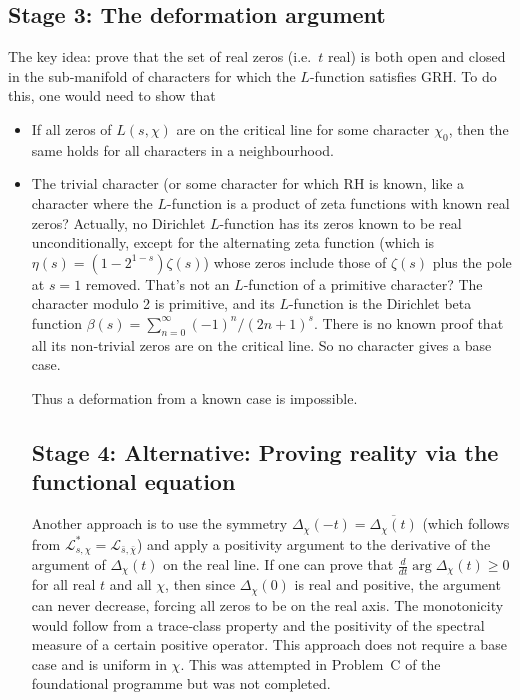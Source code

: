 \documentclass[11pt,a4paper]{article}
\begin{document}
\begin{enumerate}
\subsection{Stage 3: The deformation argument}
The key idea: prove that the set of real zeros (i.e.\ \(t\) real) is both open and closed in the sub‑manifold of characters for which the \(L\)-function satisfies GRH.  To do this, one would need to show that
\begin{itemize}
\item If all zeros of \(L(s,\chi)\) are on the critical line for some character \(\chi_0\), then the same holds for all characters in a neighbourhood.
\item The trivial character (or some character for which RH is known, like a character where the \(L\)-function is a product of zeta functions with known real zeros?  Actually, no Dirichlet \(L\)-function has its zeros known to be real unconditionally, except for the alternating zeta function (which is \(\eta(s) = (1-2^{1-s})\zeta(s)\)) whose zeros include those of \(\zeta(s)\) plus the pole at \(s=1\) removed.  That's not an \(L\)-function of a primitive character?  The character modulo 2 is primitive, and its \(L\)-function is the Dirichlet beta function \(\beta(s) = \sum_{n=0}^\infty (-1)^n/(2n+1)^s\).  There is no known proof that all its non‑trivial zeros are on the critical line.  So no character gives a base case.

Thus a deformation from a known case is impossible.

\subsection{Stage 4: Alternative: Proving reality via the functional equation}
Another approach is to use the symmetry \(\Delta_\chi(-t) = \overline{\Delta_\chi(t)}\) (which follows from \(\mathcal{L}_{s,\chi}^* = \mathcal{L}_{\bar s,\bar\chi}\)) and apply a positivity argument to the derivative of the argument of \(\Delta_\chi(t)\) on the real line.  If one can prove that \(\frac{d}{dt}\arg\Delta_\chi(t) \ge 0\) for all real \(t\) and all \(\chi\), then since \(\Delta_\chi(0)\) is real and positive, the argument can never decrease, forcing all zeros to be on the real axis.  The monotonicity would follow from a trace‑class property and the positivity of the spectral measure of a certain positive operator.  This approach does not require a base case and is uniform in \(\chi\).  This was attempted in Problem~C of the foundational programme but was not completed.


\end{itemize}
\end{enumerate}
\end{document}
